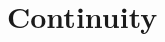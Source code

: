 \documentclass{article}
\begin{document}
\setcounter{section}{3}
\section{Continuity}
\end{document}
